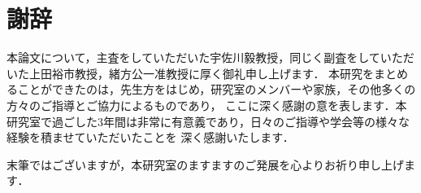 ﻿\chapter*{謝辞}
本論文について，主査をしていただいた宇佐川毅教授，同じく副査をしていただいた上田裕市教授，緒方公一准教授に厚く御礼申し上げます．
本研究をまとめることができたのは，先生方をはじめ，研究室のメンバーや家族，その他多くの方々のご指導とご協力によるものであり，
ここに深く感謝の意を表します．本研究室で過ごした3年間は非常に有意義であり，日々のご指導や学会等の様々な経験を積ませていただいたことを
深く感謝いたします．

末筆ではございますが，本研究室のますますのご発展を心よりお祈り申し上げます．
